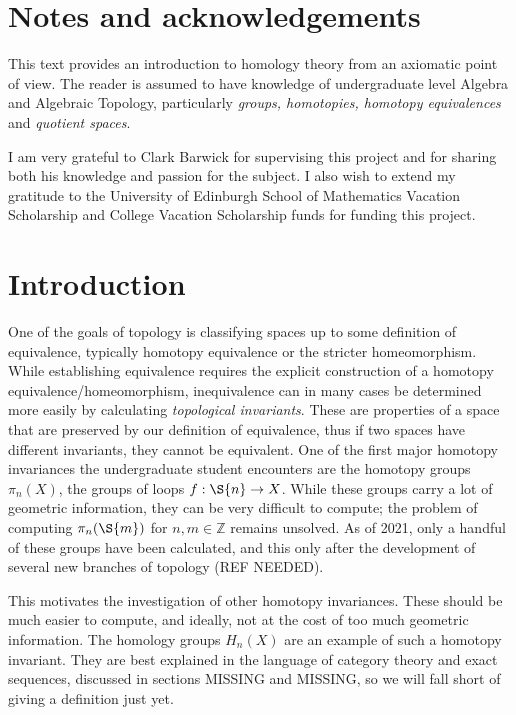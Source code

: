 \section{Notes and acknowledgements}
This text provides an introduction to homology theory from an axiomatic point of view. The reader is assumed to have knowledge of undergraduate level Algebra and Algebraic Topology, particularly \textit{groups, homotopies, homotopy equivalences} and \textit{quotient spaces}.

I am very grateful to Clark Barwick for supervising this project and for sharing both his knowledge and passion for the subject. I also wish to extend my gratitude to the University of Edinburgh School of Mathematics Vacation Scholarship and College Vacation Scholarship funds for funding this project.
\newpage
\section{Introduction}
One of the goals of topology is classifying spaces up to some definition of equivalence, typically homotopy equivalence or the stricter homeomorphism. While establishing equivalence requires the explicit construction of a homotopy equivalence/homeomorphism, inequivalence can in many cases be determined more easily by calculating \textit{topological invariants}. These are properties of a space that are preserved by our definition of equivalence, thus if two spaces have different invariants, they cannot be equivalent. One of the first major homotopy invariances the undergraduate student encounters are the homotopy groups $\pi_n(X)$, the groups of loops $f:\S{n}\rightarrow X$. While these groups carry a lot of geometric information, they can be very difficult to compute; the problem of computing $\pi_n(\S{m})$ for $n,m\in \mathbb{Z}$ remains unsolved. As of 2021, only a handful of these groups have been calculated, and this only after the development of several new branches of topology (REF NEEDED).

This motivates the investigation of other homotopy invariances. These should be much easier to compute, and ideally, not at the cost of too much geometric information. The homology groups $H_n(X)$ are an example of such a homotopy invariant. They are best explained in the language of category theory and exact sequences, discussed in sections MISSING and MISSING, so we will fall short of giving a definition just yet.

